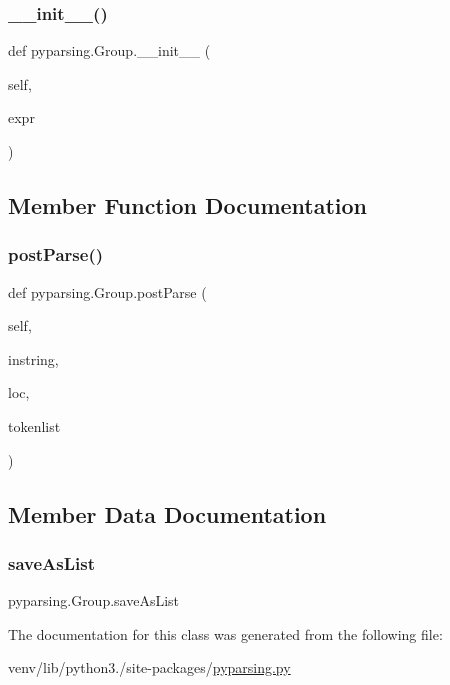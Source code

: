 \subsubsection{\texorpdfstring{\+\_\+\+\_\+init\+\_\+\+\_\+()}{\_\_init\_\_()}}
{\footnotesize\ttfamily def pyparsing.\+Group.\+\_\+\+\_\+init\+\_\+\+\_\+ (\begin{DoxyParamCaption}\item[{}]{self,  }\item[{}]{expr }\end{DoxyParamCaption})}



\subsection{Member Function Documentation}
\mbox{\label{classpyparsing_1_1Group_a0a74b09c6c2426a654b02ea94a39069e}} 
\subsubsection{\texorpdfstring{post\+Parse()}{postParse()}}
{\footnotesize\ttfamily def pyparsing.\+Group.\+post\+Parse (\begin{DoxyParamCaption}\item[{}]{self,  }\item[{}]{instring,  }\item[{}]{loc,  }\item[{}]{tokenlist }\end{DoxyParamCaption})}



\subsection{Member Data Documentation}
\mbox{\label{classpyparsing_1_1Group_a6da052a9b51fd54a0a43f215418a1f30}} 
\subsubsection{\texorpdfstring{save\+As\+List}{saveAsList}}
{\footnotesize\ttfamily pyparsing.\+Group.\+save\+As\+List}



The documentation for this class was generated from the following file\+:\begin{DoxyCompactItemize}
\item 
venv/lib/python3./site-\/packages/\hyperlink{pyparsing_8py}{pyparsing.\+py}\end{DoxyCompactItemize}
